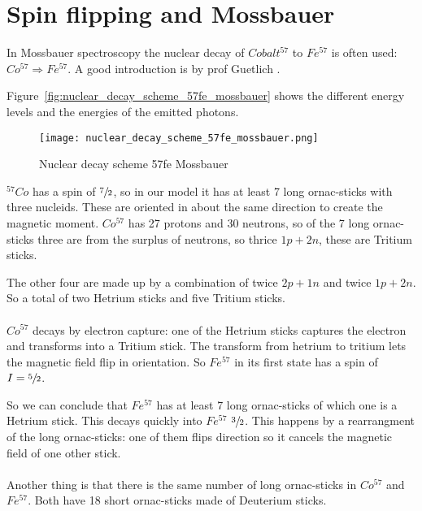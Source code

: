 \section{Spin flipping and Mossbauer}

In Mossbauer spectroscopy the nuclear decay of $Cobalt^{57}$ to $Fe^{57}$ is often used: $Co^{57} \Rightarrow Fe^{57}$.
A good introduction is by prof Guetlich \cite{Guetlich}.

Figure~\vref{fig:nuclear_decay_scheme_57fe_mossbauer} shows the different energy levels and the energies of the emitted photons.


\begin{figure}[!ht]
    \texttt{[image: nuclear\_decay\_scheme\_57fe\_mossbauer.png]}
    \caption{Nuclear decay scheme 57fe Mossbauer\label{fig:nuclear_decay_scheme_57fe_mossbauer}}
    
\end{figure}





$^{57}Co$ has a spin of $\sfrac{7}{2}$, so in our model it has at least 7 long ornac-sticks with three nucleids. These are oriented in about the same direction to create the magnetic moment.
$Co^{57}$ has 27 protons and 30 neutrons, so of the 7  long ornac-sticks three are from the surplus of neutrons, so thrice $1p+2n$, these are Tritium sticks. 

The other four are made up by a combination of twice $2p+1n$ and twice $1p+2n$. So a total of two Hetrium sticks and five Tritium sticks.

\paragraph{}
$Co^{57}$  decays by electron capture: one of the Hetrium sticks captures the electron and transforms into a Tritium stick. The transform from hetrium to tritium lets the magnetic field flip in orientation. So $Fe^{57}$ in its first state has a spin of $I = \sfrac{5}{2}$.

So we can conclude that $Fe^{57}$ has at least 7 long ornac-sticks of which one is a Hetrium stick.
This decays quickly into $Fe^{57}$ $\sfrac{3}{2}$. This happens by a rearrangment of the long ornac-sticks: one of them flips direction so it cancels the magnetic field of one other stick.

\paragraph{}
Another thing is that there is the same number of long ornac-sticks in $Co^{57}$ and $Fe^{57}$.
Both have 18 short ornac-sticks made of Deuterium sticks. 

